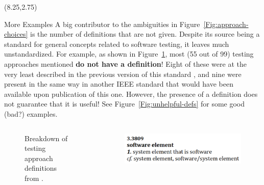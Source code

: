 \documentclass[22pt]{beamer}
\begin{document}
\begin{frame}[fragile]
    \begin{textblock}{7.25}(8.25,2.75)
        \begin{block}{\fontsize{37}{20}\selectfont More Examples}
            A big contributor to the ambiguities in
            Figure~\ref{Fig:approach-choices} is the number of definitions that
            are not given. Despite its source \cite{IEEE2022} being a standard
            for general concepts related to software testing, it leaves much
            unstandardized. For example, as shown in Figure~\ref{Fig:IEEEdefs},
            most (55 out of 99) testing approaches mentioned \textbf{do not
                have a definition}! Eight of these were at the very least
            described in the previous version of this standard \cite{IEEE2013},
            and nine were present in the same way in another
            IEEE standard \cite{IEEE2017} that would have been available
            upon publication of this one. However, the presence of a
            definition does not guarantee that it is useful! See
            Figure~\ref{Fig:unhelpful-defs} for some good (bad?) examples.
            \vspace{-1cm}
            \begin{columns}
                \begin{column}{0.4\textwidth}
                    \begin{center}
                        \begin{figure}
                            \label{Fig:IEEEdefs}
                            \caption{Breakdown of testing approach definitions
                                from \cite{IEEE2022}.}
                        \end{figure}
                    \end{center}
                \end{column}
                \begin{column}{0.475\textwidth}
                    \begin{center}
                        \begin{figure}
                            \includegraphics[width=\textwidth]{software element.png}


\end{figure}
\end{center}
\end{column}
\end{columns}
\end{block}
\end{textblock}
\end{frame}
\end{document}
